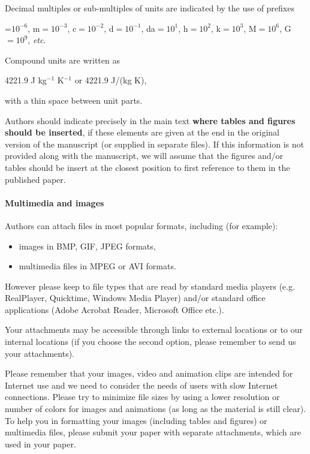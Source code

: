 \documentclass{lpaper} %
\begin{document}
    Decimal multiples or sub-multiples of units are indicated by the use of prefixes

\begin{center}
    \textmu=$10^{-6}$, m$=10^{-3}$, c$=10^{-2}$, d$=10^{-1}$,
    da$=10^1$, h$=10^2$, k$=10^3$, M$=10^6$, G$=10^9$, {\em etc}.
\end{center}

    Compound units are written as
\begin{center}
    4221.9 J kg$^{-1}$ K$^{-1}$ or 4221.9 J/(kg K),
\end{center}
    with a thin space between unit parts.


    Authors should indicate precisely in the main text {\bfseries where tables and figures should be inserted}, if these elements are given at the end in the original version of the manuscript (or supplied in separate files).
    If this information is not provided along with the manuscript, we will assume that the figures and/or tables should be insert at the closest position to first reference to them in the published paper.

\paragraph{Multimedia and images}
    Authors can attach files in most popular formats, including (for example):
\begin{itemize}
\item images in BMP, GIF, JPEG formats,
\item multimedia files in MPEG or AVI formats.
\end{itemize}

However please keep to file types that are read by standard media players (e.g. RealPlayer, Quicktime, Windows Media Player) and/or standard office applications (Adobe Acrobat Reader, Microsoft Office etc.).

    Your attachments may be accessible through links to external locations or to our internal locations (if you choose the second option, please remember to send us your attachments).

    Please remember that your images, video and animation clips are intended for Internet use and we need to consider the needs of users with slow Internet connections. Please try to minimize file sizes by using a lower resolution or number of colors for images and animations (as long as the material is still clear). To help you in formatting your images (including tables and figures) or multimedia files, please submit your paper with separate attachments, which are used in your paper.
\end{document}
